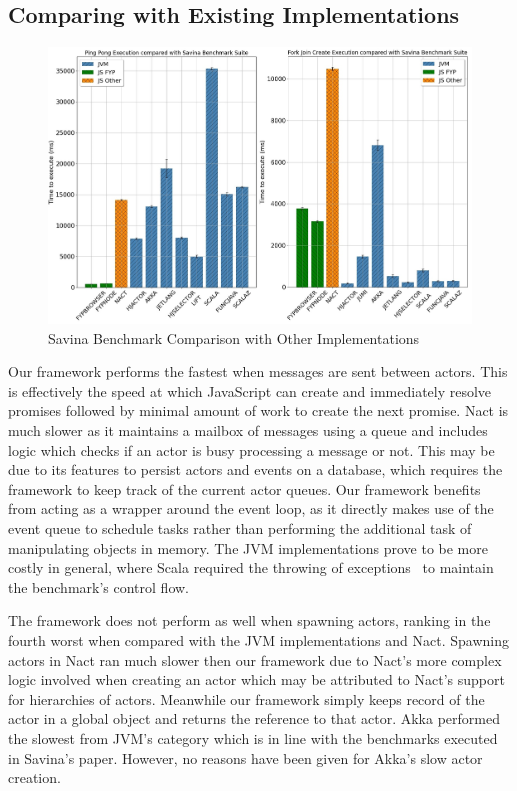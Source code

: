 \documentclass[oneside]{um-fict}
\begin{document}
\subsection{Comparing with Existing Implementations}
\begin{figure}[H]
    \begin{centering}
        \includegraphics[width=\textwidth]{resources/savina.png}
        \caption{Savina Benchmark Comparison with Other Implementations}\label{fig:savina}
    \end{centering}
\end{figure}
Our framework performs the fastest when messages are sent between actors. This is effectively the speed at which JavaScript can create and immediately resolve promises followed by minimal amount of work to create the next promise. Nact is much slower as it maintains a mailbox of messages using a queue and includes logic which checks if an actor is busy processing a message or not. This may be due to its features to persist actors and events on a database, which requires the framework to keep track of the current actor queues. Our framework benefits from acting as a wrapper around the event loop, as it directly makes use of the event queue to schedule tasks rather than performing the additional task of manipulating objects in memory. The JVM implementations prove to be more costly in general, where Scala required the throwing of exceptions~\cite{savina} to maintain the benchmark's control flow.

The framework does not perform as well when spawning actors, ranking in the fourth worst when compared with the JVM implementations and Nact.  Spawning actors in Nact ran much slower then our framework due to Nact's more complex logic involved when creating an actor which may be attributed to Nact's support for hierarchies of actors. Meanwhile our framework simply keeps record of the actor in a global object and returns the reference to that actor. Akka performed the slowest from JVM's category which is in line with the benchmarks executed in Savina's paper.  However, no reasons have been given for Akka's slow actor creation.
\end{document}
